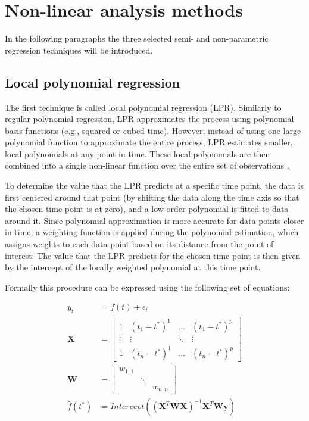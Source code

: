 \documentclass[man, floatsintext]{apa7}
\begin{document}
\section{Non-linear analysis methods}\label{method_introduction}

In the following paragraphs the three selected semi- and non-parametric
regression techniques will be introduced.

\subsection{Local polynomial regression}

The first technique is called local polynomial regression (LPR). Similarly to
regular polynomial regression, LPR approximates the process using polynomial
basis functions (e.g., squared or cubed time). However, instead of using one
large polynomial function to approximate the entire process, LPR estimates
smaller, local polynomials at any point in time. These local polynomials are
then combined into a single non-linear function over the entire set of
observations \parencite{fan_adaptive_1995, ruppert_multivariate_1994,
  fan_local_2018}.

To determine the value that the LPR predicts at a specific time point, the data
is first centered around that point (by shifting the data along the time axis
so that the chosen time point is at zero), and a low-order polynomial is fitted
to data around it. Since polynomial approximation is more accurate for data
points closer in time, a weighting function is applied during the polynomial
estimation, which assigns weights to each data point based on its distance from
the point of interest. The value that the LPR predicts for the chosen time
point is then given by the intercept of the locally weighted polynomial at this
time point.

Formally this procedure can be expressed using the following set of equations:

\begin{equation} \label{eq:lpr_equations}
  \begin{aligned}
    y_t          & = f(t) + \epsilon_t                            \\
    \textbf{X}   & =
    \begin{bmatrix}
      1      & (t_1 - t^*)^1 & \dots  & (t_1 - t^*)^p \\
      \vdots & \vdots        & \ddots & \vdots        \\
      1      & (t_n - t^*)^1 & \dots  & (t_n - t^*)^p
    \end{bmatrix} \\
    \textbf{W}   & =
    \begin{bmatrix}
      w_{1, 1} &        &          \\
               & \ddots &          \\
               &        & w_{n, n}
    \end{bmatrix}                               \\
    \hat{f}(t^*) & =
    Intercept((\textbf{X}^T\textbf{WX})^{-1}\textbf{X}^T\textbf{Wy})
  \end{aligned}
\end{equation}
\end{document}
